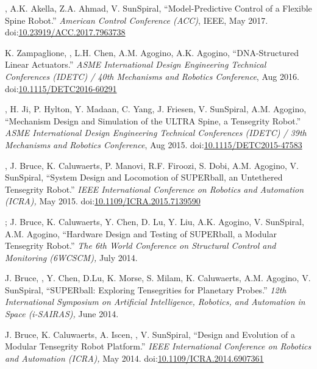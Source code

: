 \documentclass[letterpaper]{deedy-resume} %
\newcommand\doilink[1]{\href{http://dx.doi.org/#1}{#1}}
\newcommand\doi[1]{doi:\doilink{#1}}
\begin{document}
{\begin{etaremune}[itemsep=0.1cm]
\item \underline{{}}, A.K. Akella, Z.A. Ahmad, V. SunSpiral, ``Model-Predictive Control of a Flexible Spine Robot.'' {\it American Control Conference (ACC)}, IEEE, May 2017. \doi{10.23919/ACC.2017.7963738}

\item K. Zampaglione, \underline{{}}, L.H. Chen, A.M. Agogino,  A.K. Agogino, ``DNA-Structured Linear Actuators.'' {\it ASME International Design Engineering Technical Conferences (IDETC) / 40th Mechanisms and Robotics Conference}, Aug 2016. \doi{10.1115/DETC2016-60291}
  
\item \underline{{}}, H. Ji, P. Hylton, Y. Madaan, C. Yang, J. Friesen, V. SunSpiral, A.M. Agogino, ``Mechanism Design and Simulation of the ULTRA Spine, a Tensegrity Robot.'' {\it ASME International Design Engineering Technical Conferences (IDETC) / 39th Mechanisms and Robotics Conference}, Aug 2015. \doi{10.1115/DETC2015-47583}

\item \underline{{}}, J. Bruce, K. Caluwaerts, P. Manovi, R.F. Firoozi, S. Dobi, A.M. Agogino, V. SunSpiral, ``System Design and Locomotion of SUPERball, an Untethered Tensegrity Robot.'' {\it IEEE International Conference on Robotics and Automation (ICRA),} May 2015. \doi{10.1109/ICRA.2015.7139590}

\item \underline{{}}; J. Bruce, K. Caluwaerts, Y. Chen, D. Lu, Y. Liu, A.K. Agogino, V. SunSpiral, A.M. Agogino, ``Hardware Design and Testing of SUPERball, a Modular Tensegrity Robot.'' {\it The 6th World Conference on Structural Control and Monitoring (6WCSCM),} July 2014.

\item J. Bruce, \underline{{}}, Y. Chen, D.Lu, K. Morse, S. Milam, K. Caluwaerts, A.M. Agogino, V. SunSpiral, ``SUPERball: Exploring Tensegrities for Planetary Probes.'' {\it 12th International Symposium on Artificial Intelligence, Robotics, and Automation in Space (i-SAIRAS),} June 2014.

\item J. Bruce, K. Caluwaerts, A. Iscen, \underline{{}}, V. SunSpiral, ``Design and Evolution of a Modular Tensegrity Robot Platform.'' {\it IEEE International Conference on Robotics and Automation (ICRA),} May 2014. \doi{10.1109/ICRA.2014.6907361}


\end{etaremune}}
\end{document}
